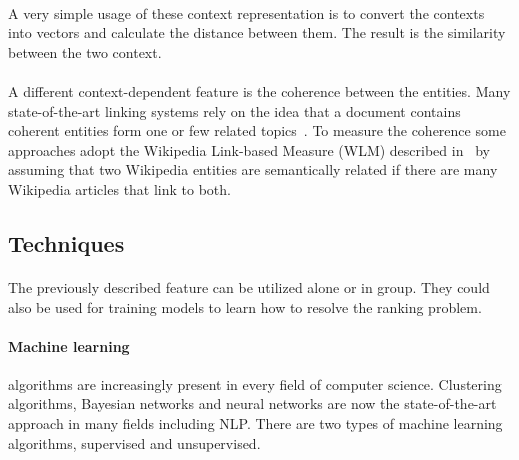 \paragraph{} A very simple usage of these context representation is to convert the contexts into vectors and calculate the distance between them. The result is the similarity between the two context.  

\paragraph{} A different context-dependent feature is the coherence between the entities. Many state-of-the-art linking systems rely on the idea that a document contains coherent entities form one or few related topics~\cite{hoffart2011robust}. To measure the coherence some approaches adopt the Wikipedia Link-based Measure (WLM) described in~\cite{milne2008learning} by assuming that two Wikipedia entities are semantically related if there are many Wikipedia articles that link to both.

\subsection{Techniques}
\paragraph{} The previously described feature can be utilized alone or in group. They could also be used for training models to learn how to resolve the ranking problem.

\paragraph{Machine learning} algorithms are increasingly present in every field of computer science. Clustering algorithms, Bayesian networks and neural networks are now the state-of-the-art approach in many fields including NLP. There are two types of machine learning algorithms, supervised and unsupervised.

